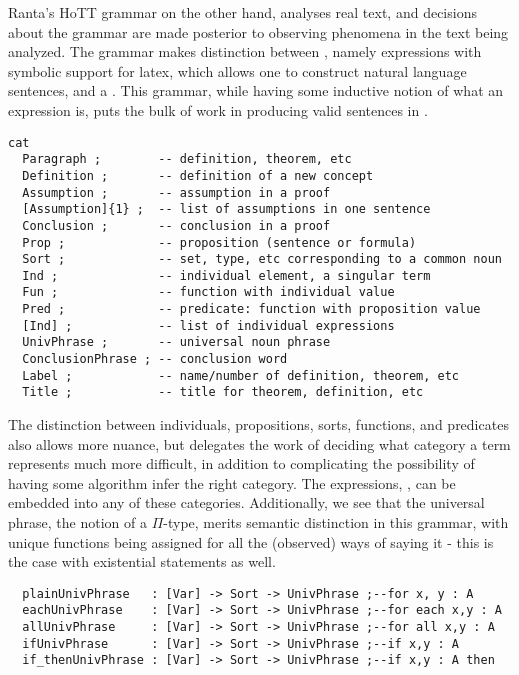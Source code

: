 Ranta's HoTT grammar on the other hand, analyses real text, and decisions about
the grammar are made posterior to observing phenomena in the text being
analyzed. The grammar makes distinction between , namely
expressions with symbolic support for latex,  which allows
one to construct natural language sentences, and a . This
grammar, while having some inductive notion of what an expression is, puts the
bulk of work in producing valid sentences in .

\begin{verbatim}
cat
  Paragraph ;        -- definition, theorem, etc
  Definition ;       -- definition of a new concept
  Assumption ;       -- assumption in a proof  
  [Assumption]{1} ;  -- list of assumptions in one sentence 
  Conclusion ;       -- conclusion in a proof 
  Prop ;             -- proposition (sentence or formula) 
  Sort ;             -- set, type, etc corresponding to a common noun
  Ind ;              -- individual element, a singular term
  Fun ;              -- function with individual value
  Pred ;             -- predicate: function with proposition value 
  [Ind] ;            -- list of individual expressions  
  UnivPhrase ;       -- universal noun phrase          
  ConclusionPhrase ; -- conclusion word               
  Label ;            -- name/number of definition, theorem, etc 
  Title ;            -- title for theorem, definition, etc
\end{verbatim}

The distinction between individuals, propositions, sorts, functions, and
predicates also allows more nuance, but delegates the work of deciding what
category a term represents much more difficult, in addition to complicating the
possibility of having some algorithm infer the right category. The expressions,
, can be embedded into any of these categories. Additionally, we
see that the universal phrase, the notion of a $\Pi$-type, merits semantic
distinction in this grammar, with unique functions being assigned for all the
(observed) ways of saying it - this is the case with existential statements as
well.

\begin{verbatim}
  plainUnivPhrase   : [Var] -> Sort -> UnivPhrase ;--for x, y : A
  eachUnivPhrase    : [Var] -> Sort -> UnivPhrase ;--for each x,y : A
  allUnivPhrase     : [Var] -> Sort -> UnivPhrase ;--for all x,y : A
  ifUnivPhrase      : [Var] -> Sort -> UnivPhrase ;--if x,y : A
  if_thenUnivPhrase : [Var] -> Sort -> UnivPhrase ;--if x,y : A then
\end{verbatim}

